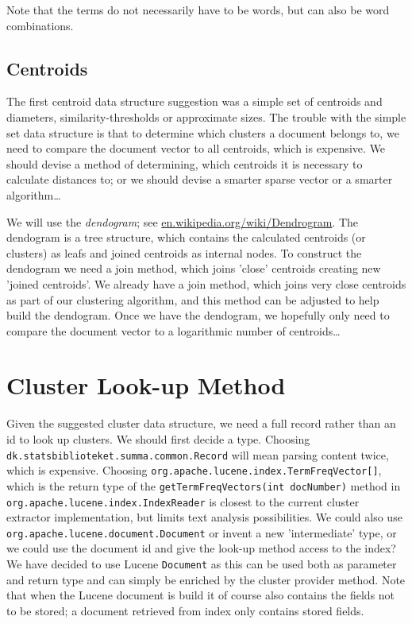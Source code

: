 \documentclass[a4paper,12pt]{article}
\begin{document}
Note that the terms do not necessarily have to be words, but can also
be word combinations.

\subsection{Centroids}

The first centroid data structure suggestion was a simple set of
centroids and diameters, similarity-thresholds or approximate sizes.
The trouble with the simple set data structure is that to determine
which clusters a document belongs to, we need to compare the document
vector to all centroids, which is expensive. We should devise a method
of determining, which centroids it is necessary to calculate distances
to; or we should devise a smarter sparse vector or a smarter
algorithm\ldots 

We will use the \emph{dendogram}; see
\url{en.wikipedia.org/wiki/Dendrogram}. The dendogram is a tree
structure, which contains the calculated centroids (or clusters) as
leafs and joined centroids as internal nodes. To construct the
dendogram we need a join method, which joins 'close' centroids
creating new 'joined centroids'. We already have a join method, which
joins very close centroids as part of our clustering algorithm, and
this method can be adjusted to help build the dendogram. Once we have
the dendogram, we hopefully only need to compare the document vector
to a logarithmic number of centroids\ldots

\section{Cluster Look-up Method}
\label{cluster-look-up-method}

Given the suggested cluster data structure, we need a full record
rather than an id to look up clusters. We should first decide a
type. Choosing \texttt{dk.statsbiblioteket.summa.common.Record} will
mean parsing content twice, which is expensive. Choosing
\texttt{org.apache.lucene.index.TermFreqVector[]}, which is the return
type of the \texttt{getTermFreqVectors(int docNumber)} method in
\texttt{org.apache.lucene.index.IndexReader} is closest to the current
cluster extractor implementation, but limits text analysis
possibilities. We could also use
\texttt{org.apache.lucene.document.Document} or invent a new
'intermediate' type, or we could use the document id and give the
look-up method access to the index? We have decided to use Lucene
\texttt{Document} as this can be used both as parameter and return
type and can simply be enriched by the cluster provider method. Note
that when the Lucene document is build it of course also contains the
fields not to be stored; a document retrieved from index only contains
stored fields.
\end{document}
